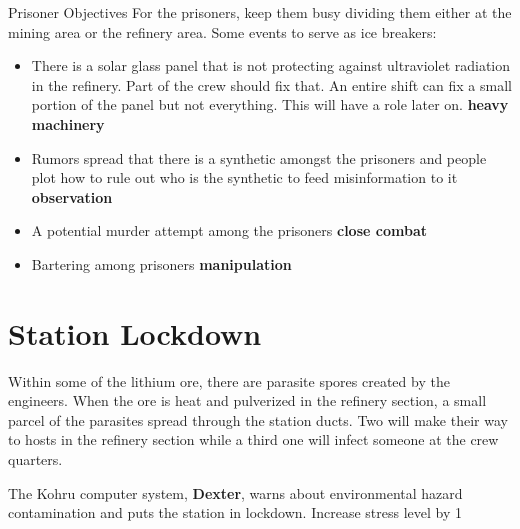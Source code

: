 \medskip
\begin{rpg-commentbox}{Prisoner Objectives}
For the prisoners, keep them busy dividing them either at the mining area or the refinery area. Some events to serve as ice breakers:

\begin{itemize}
    \item There is a solar glass panel that is not protecting against ultraviolet radiation in the refinery. Part of the crew should fix that. An entire shift can fix a small portion of the panel but not everything. This will have a role later on. \textbf{heavy machinery}

    \item Rumors spread that there is a synthetic amongst the prisoners and people plot how to rule out who is the synthetic to feed misinformation to it \textbf{observation}

    \item A potential murder attempt among the prisoners \textbf{close combat}

    \item Bartering among prisoners \textbf{manipulation}
\end{itemize}
\end{rpg-commentbox}


\newsect

\section{Station Lockdown}



\begin{rpg-commentbox}{}
    
    Within some of the lithium ore, there are parasite spores created by the engineers. When the ore is heat and pulverized in the refinery section, a small parcel of the parasites spread through the station ducts. Two will make their way to hosts in the refinery section while a third one will infect someone at the crew quarters. 
    
    The Kohru computer system, \textbf{Dexter}, warns about environmental hazard contamination and puts the station in lockdown. Increase stress level by 1
\end{rpg-commentbox}    



